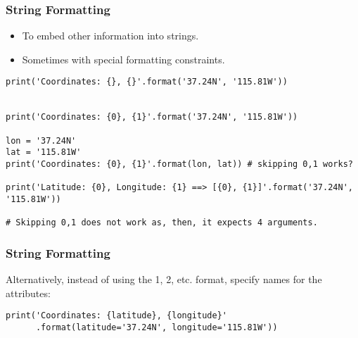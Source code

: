 \begin{frame}[fragile]\frametitle{String Formatting}
  \begin{itemize}
  \item To embed other information into strings. 
\item Sometimes with special formatting constraints.
  \end{itemize}

\begin{lstlisting}
print('Coordinates: {}, {}'.format('37.24N', '115.81W'))


print('Coordinates: {0}, {1}'.format('37.24N', '115.81W'))

lon = '37.24N'
lat = '115.81W'
print('Coordinates: {0}, {1}'.format(lon, lat)) # skipping 0,1 works?

print('Latitude: {0}, Longitude: {1} ==> [{0}, {1}]'.format('37.24N', '115.81W'))

# Skipping 0,1 does not work as, then, it expects 4 arguments.
\end{lstlisting}
\end{frame}

\begin{frame}[fragile]\frametitle{String Formatting}
Alternatively, instead of using the {1}, {2}, etc. format, specify names for the attributes:
\begin{lstlisting}
print('Coordinates: {latitude}, {longitude}'
      .format(latitude='37.24N', longitude='115.81W'))
\end{lstlisting}
\end{frame}




